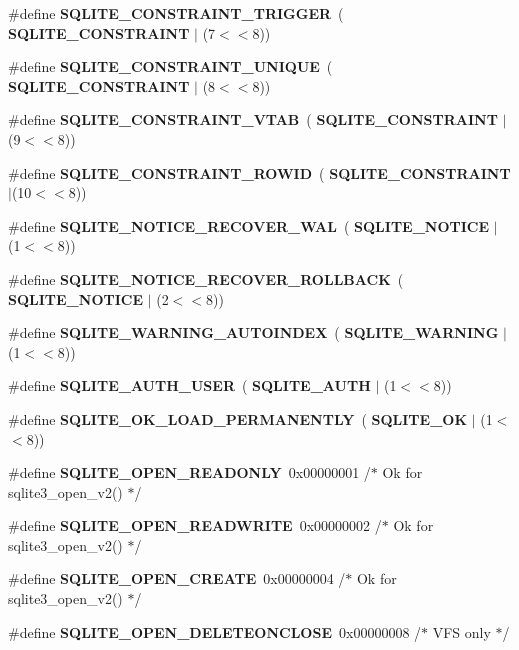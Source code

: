 \begin{DoxyCompactItemize}
\item 
\#define \textbf{ S\+Q\+L\+I\+T\+E\+\_\+\+C\+O\+N\+S\+T\+R\+A\+I\+N\+T\+\_\+\+T\+R\+I\+G\+G\+ER}~(\textbf{ S\+Q\+L\+I\+T\+E\+\_\+\+C\+O\+N\+S\+T\+R\+A\+I\+NT} $\vert$ (7$<$$<$8))
\item 
\#define \textbf{ S\+Q\+L\+I\+T\+E\+\_\+\+C\+O\+N\+S\+T\+R\+A\+I\+N\+T\+\_\+\+U\+N\+I\+Q\+UE}~(\textbf{ S\+Q\+L\+I\+T\+E\+\_\+\+C\+O\+N\+S\+T\+R\+A\+I\+NT} $\vert$ (8$<$$<$8))
\item 
\#define \textbf{ S\+Q\+L\+I\+T\+E\+\_\+\+C\+O\+N\+S\+T\+R\+A\+I\+N\+T\+\_\+\+V\+T\+AB}~(\textbf{ S\+Q\+L\+I\+T\+E\+\_\+\+C\+O\+N\+S\+T\+R\+A\+I\+NT} $\vert$ (9$<$$<$8))
\item 
\#define \textbf{ S\+Q\+L\+I\+T\+E\+\_\+\+C\+O\+N\+S\+T\+R\+A\+I\+N\+T\+\_\+\+R\+O\+W\+ID}~(\textbf{ S\+Q\+L\+I\+T\+E\+\_\+\+C\+O\+N\+S\+T\+R\+A\+I\+NT} $\vert$(10$<$$<$8))
\item 
\#define \textbf{ S\+Q\+L\+I\+T\+E\+\_\+\+N\+O\+T\+I\+C\+E\+\_\+\+R\+E\+C\+O\+V\+E\+R\+\_\+\+W\+AL}~(\textbf{ S\+Q\+L\+I\+T\+E\+\_\+\+N\+O\+T\+I\+CE} $\vert$ (1$<$$<$8))
\item 
\#define \textbf{ S\+Q\+L\+I\+T\+E\+\_\+\+N\+O\+T\+I\+C\+E\+\_\+\+R\+E\+C\+O\+V\+E\+R\+\_\+\+R\+O\+L\+L\+B\+A\+CK}~(\textbf{ S\+Q\+L\+I\+T\+E\+\_\+\+N\+O\+T\+I\+CE} $\vert$ (2$<$$<$8))
\item 
\#define \textbf{ S\+Q\+L\+I\+T\+E\+\_\+\+W\+A\+R\+N\+I\+N\+G\+\_\+\+A\+U\+T\+O\+I\+N\+D\+EX}~(\textbf{ S\+Q\+L\+I\+T\+E\+\_\+\+W\+A\+R\+N\+I\+NG} $\vert$ (1$<$$<$8))
\item 
\#define \textbf{ S\+Q\+L\+I\+T\+E\+\_\+\+A\+U\+T\+H\+\_\+\+U\+S\+ER}~(\textbf{ S\+Q\+L\+I\+T\+E\+\_\+\+A\+U\+TH} $\vert$ (1$<$$<$8))
\item 
\#define \textbf{ S\+Q\+L\+I\+T\+E\+\_\+\+O\+K\+\_\+\+L\+O\+A\+D\+\_\+\+P\+E\+R\+M\+A\+N\+E\+N\+T\+LY}~(\textbf{ S\+Q\+L\+I\+T\+E\+\_\+\+OK} $\vert$ (1$<$$<$8))
\item 
\#define \textbf{ S\+Q\+L\+I\+T\+E\+\_\+\+O\+P\+E\+N\+\_\+\+R\+E\+A\+D\+O\+N\+LY}~0x00000001  /$\ast$ Ok for sqlite3\+\_\+open\+\_\+v2() $\ast$/
\item 
\#define \textbf{ S\+Q\+L\+I\+T\+E\+\_\+\+O\+P\+E\+N\+\_\+\+R\+E\+A\+D\+W\+R\+I\+TE}~0x00000002  /$\ast$ Ok for sqlite3\+\_\+open\+\_\+v2() $\ast$/
\item 
\#define \textbf{ S\+Q\+L\+I\+T\+E\+\_\+\+O\+P\+E\+N\+\_\+\+C\+R\+E\+A\+TE}~0x00000004  /$\ast$ Ok for sqlite3\+\_\+open\+\_\+v2() $\ast$/
\item 
\#define \textbf{ S\+Q\+L\+I\+T\+E\+\_\+\+O\+P\+E\+N\+\_\+\+D\+E\+L\+E\+T\+E\+O\+N\+C\+L\+O\+SE}~0x00000008  /$\ast$ V\+F\+S only $\ast$/
$$
\end{DoxyCompactItemize}
